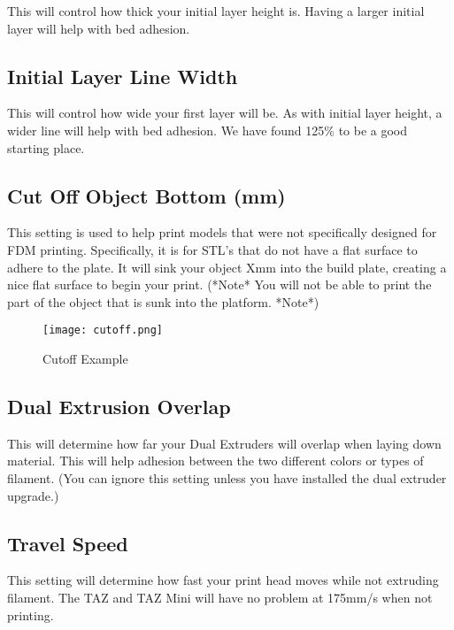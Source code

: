 This will control how thick your initial layer height is. Having a larger initial layer will help with bed adhesion.

\subsection{Initial Layer Line Width}

This will control how wide your first layer will be. As with initial layer height, a wider line will help with bed adhesion. We have found 125\% to be a good starting place.

\subsection{Cut Off Object Bottom (mm)}

This setting is used to help print models that were not specifically designed for FDM printing. Specifically, it is for STL's that do not have a flat surface to adhere to the plate. It will sink your object Xmm into the build plate, creating a nice flat surface to begin your print. (*Note* You will not be able to print the part of the object that is sunk into the platform. *Note*)
\begin{figure}[hbt]
\centering
\texttt{[image: cutoff.png]}
\caption{Cutoff Example}
\label{fig:Cutoff Example}
\end{figure}

\subsection{Dual Extrusion Overlap}

This will determine how far your Dual Extruders will overlap when laying down material. This will help adhesion between the two different colors or types of filament. (You can ignore this setting unless you have installed the dual extruder upgrade.)

\subsection{Travel Speed}

This setting will determine how fast your print head moves while not extruding filament. The TAZ and TAZ Mini will have no problem at 175mm/s when not printing.

